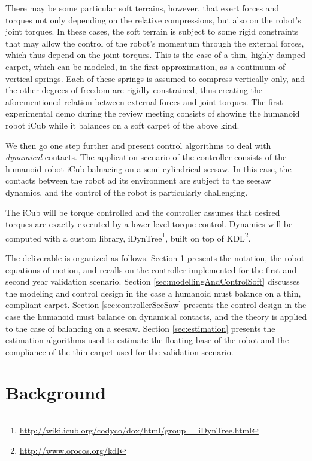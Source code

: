 \documentclass[12pt,a4paper,twoside]{article}
\begin{document}
There may be some particular soft terrains, however, that exert forces and torques not only depending on the relative compressions, but also on the robot's joint torques. In these cases, the soft terrain is subject to some rigid constraints that may allow the control of the robot's momentum through the external forces, which thus depend on the joint torques. This is the case of a thin, highly damped carpet, which can be modeled, in the first approximation, as a continuum of vertical springs. Each of these springs is assumed to compress vertically only, and the other degrees of freedom are rigidly constrained, thus creating the aforementioned relation between external forces and joint torques. The first experimental demo during the review meeting consists of showing the humanoid robot iCub while it balances on a soft carpet of the above kind.


We then go one step further and  present control algorithms to deal with \emph{dynamical} contacts. The application scenario of the controller consists of the humanoid robot iCub balnacing on a semi-cylindrical seesaw. In this case, the contacts between the robot ad its environment are subject to the seesaw dynamics, and the control of the robot is particularly challenging. 

The iCub will be torque controlled and the controller assumes that desired torques are exactly executed by a lower level torque control. Dynamics will be computed with a custom library, iDynTree\footnote{\url{http://wiki.icub.org/codyco/dox/html/group__iDynTree.html}}, built on top of KDL\footnote{\url{http://www.orocos.org/kdl}}. 

The deliverable is organized as follows. Section \ref{sec:background} presents the notation, the robot equations of motion, and recalls on the controller implemented for the first and second year validation scenario. Section \ref{sec:modellingAndControlSoft} discusses the modeling and control design in the case a humanoid must balance on a thin, compliant carpet. 
Section \ref{sec:controllerSeeSaw} presents the control design in the case the humanoid must balance on dynamical contacts, and the theory is applied to the case of balancing on a seesaw. Section \ref{sec:estimation} presents the estimation algorithms used to estimate the floating base of the robot and the compliance of the thin carpet used for the validation scenario.


\section{Background} 
\label{sec:background}
\end{document}

